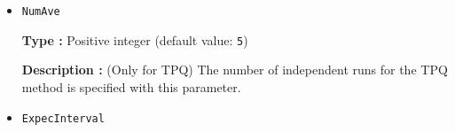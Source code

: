 \begin{itemize}
{\bf Type :} Double (the default value is provided below)

{\bf Description :} (Only for TPQ) 
$l$ as $l-\hat{H}/N_{s}$ is used in the TPQ calculation.
Usually, the largest eigenvalue of the Hamiltonian is used as $l$. 
Thus, the default value of $l$ is taken
as the summation of the absolute values of each coefficient in the Hamiltonian
divided by the number of sites.


%
%
%
%
%
%
%

\item \verb|NumAve|

{\bf Type :} Positive integer (default value: \verb|5|)

{\bf Description :} (Only for TPQ)
The number of independent runs for the TPQ method is specified 
with this parameter.

\item \verb|ExpecInterval|


\end{itemize}
